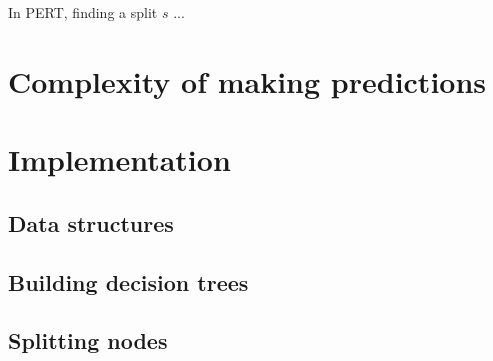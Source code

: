 In PERT, finding a split $s$ ...





\section{Complexity of making predictions}
\label{sec:5:complexity-predict}


\section{Implementation}
\label{sec:5:impl}


\subsection{Data structures}


\subsection{Building decision trees}


\subsection{Splitting nodes}

